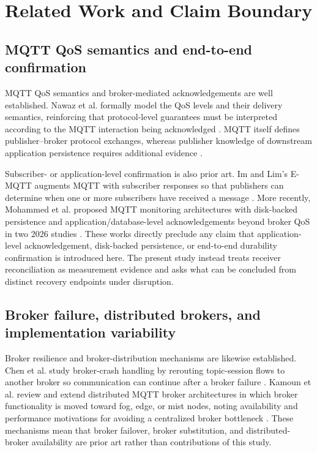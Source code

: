 \documentclass[journal]{IEEEtran}
\begin{document}
\section{Related Work and Claim Boundary}
\label{sec:related}

\subsection{MQTT QoS semantics and end-to-end confirmation}

MQTT QoS semantics and broker-mediated acknowledgements are well established. Nawaz et al. formally model the QoS levels and their delivery semantics, reinforcing that protocol-level guarantees must be interpreted according to the MQTT interaction being acknowledged \cite{nawaz2019}. MQTT itself defines publisher--broker protocol exchanges, whereas publisher knowledge of downstream application persistence requires additional evidence \cite{mqtt5}.

Subscriber- or application-level confirmation is also prior art. Im and Lim's E-MQTT augments MQTT with subscriber responses so that publishers can determine when one or more subscribers have received a message \cite{emqtt}. More recently, Mohammed et al. proposed MQTT monitoring architectures with disk-backed persistence and application/database-level acknowledgements beyond broker QoS in two 2026 studies \cite{mohammed2026resilient,mohammed2026scalable}. These works directly preclude any claim that application-level acknowledgement, disk-backed persistence, or end-to-end durability confirmation is introduced here. The present study instead treats receiver reconciliation as measurement evidence and asks what can be concluded from distinct recovery endpoints under disruption.

\subsection{Broker failure, distributed brokers, and implementation variability}

Broker resilience and broker-distribution mechanisms are likewise established. Chen et al. study broker-crash handling by rerouting topic-session flows to another broker so communication can continue after a broker failure \cite{chen2020}. Kamoun et al. review and extend distributed MQTT broker architectures in which broker functionality is moved toward fog, edge, or mist nodes, noting availability and performance motivations for avoiding a centralized broker bottleneck \cite{kamoun2024}. These mechanisms mean that broker failover, broker substitution, and distributed-broker availability are prior art rather than contributions of this study.
\end{document}
